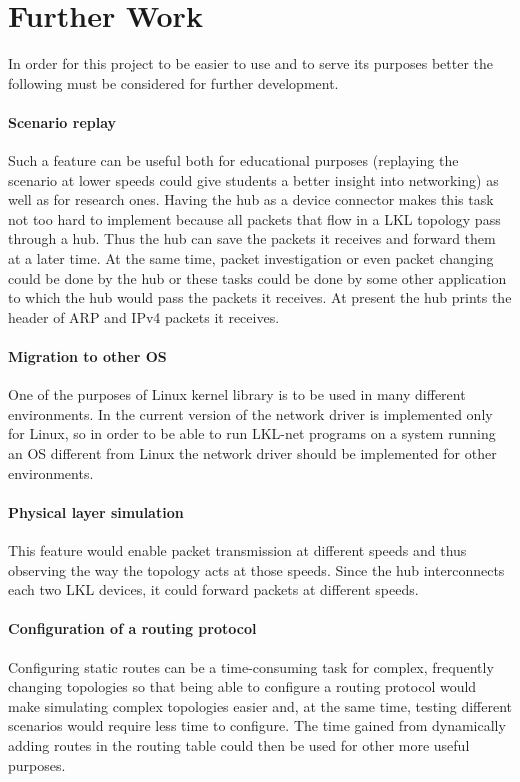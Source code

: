 \chapter{Further Work}
\label{chapter:further}
In order for this project to be easier to use and to serve its purposes better the following must be considered for further development.

\subsubsection{Scenario replay}
\label{sec:scenario-replay}
Such a feature can be useful both for educational purposes (replaying the scenario at lower speeds could give students 
a better insight into networking) as well as for research ones. Having the hub as a 
device connector makes this task not too hard to implement because all packets that flow in a LKL topology pass through a hub. 
Thus the hub can save the packets it receives and forward them at a later time. At the same time, packet investigation or even
packet changing could be done by the hub or these tasks could be done by some other application to which the hub would pass the 
packets it receives. At present the hub prints the header of ARP and IPv4 packets it receives.

\subsubsection{Migration to other OS}
\label{sec:migration-os}
One of the purposes of Linux kernel library is to be used in many different environments. In the current version of \project the 
network driver is implemented only for Linux, so in order to be able to run LKL-net programs on a system running an 
OS different from Linux the network driver should be implemented for other environments.

\subsubsection{Physical layer simulation}
\label{sec:physica-sim}
This feature would enable packet transmission at different speeds and thus observing the way the 
topology acts at those speeds. Since the hub interconnects each two LKL devices, it could forward 
packets at different speeds.
\subsubsection{Configuration of a routing protocol}
\label{sec:routing-prot}
Configuring static routes can be a time-consuming task for complex, frequently changing topologies so that 
being able to configure a routing protocol would make simulating complex topologies easier and, at the same time, 
testing different scenarios would require less time to configure. The time gained from dynamically adding routes in 
the routing table could then be used for other more useful purposes.

